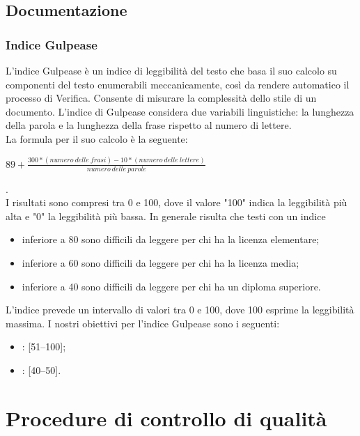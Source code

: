 \subsection{Documentazione}

\subsubsection{Indice Gulpease}
L'indice Gulpease è un indice di leggibilità del testo che basa il suo calcolo su componenti del testo enumerabili meccanicamente, così da rendere automatico il processo di Verifica. Consente di misurare la complessità dello stile di un documento.
L'indice di Gulpease considera due variabili linguistiche: la lunghezza della parola e la lunghezza della frase rispetto al numero di lettere.\\
La formula per il suo calcolo è la seguente:
\\
\begin{center}
\begin{math}
89+\frac{300*(numero\:delle\:frasi)-10*(numero\:delle\:lettere)}{numero\:delle\:parole}
\end{math}
\end{center}
.\\
I risultati sono compresi tra 0 e 100, dove il valore "100" indica la leggibilità più alta e "0" la leggibilità più bassa. In generale risulta che testi con un indice
\begin{itemize}
\item inferiore a 80 sono difficili da leggere per chi ha la licenza elementare;
\item inferiore a 60 sono difficili da leggere per chi ha la licenza media;
\item inferiore a 40 sono difficili da leggere per chi ha un diploma superiore.
\end{itemize}
L'indice prevede un intervallo di valori tra 0 e 100, dove 100 esprime la leggibilità massima.
I nostri obiettivi per l'indice Gulpease sono i seguenti:
\begin{itemize}
\item {}: [51--100];
\item {}: [40--50].
\end{itemize}

\newpage

\section{Procedure di controllo di qualità}


